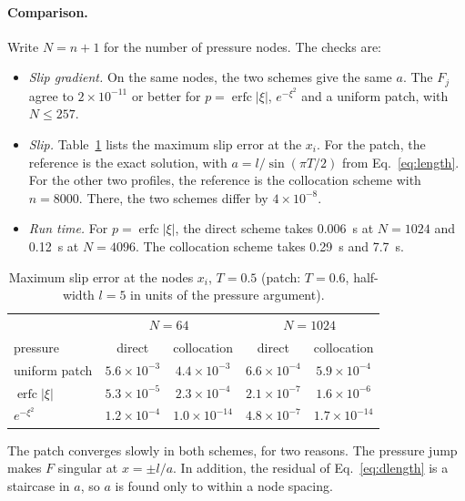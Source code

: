 \documentclass[12pt]{article}
\newcommand{\erfc}{\operatorname{erfc}}
\begin{document}
\paragraph{Comparison.} Write $N=n+1$ for the number of pressure nodes. The
checks are:
\begin{itemize}
	\item \emph{Slip gradient.} On the same nodes, the two schemes give the same
	      $a$. The $F_j$ agree to $2\times10^{-11}$ or better for $p = \erfc|\xi|$,
	      $e^{-\xi^2}$ and a uniform patch, with $N\le257$.
	\item \emph{Slip.} Table~\ref{tab:direct} lists the maximum slip error at the
	      $x_i$. For the patch, the reference is the exact solution, with
	      $a = l/\sin(\pi T/2)$ from Eq.~\eqref{eq:length}. For the other two
	      profiles, the reference is the collocation scheme with $n=8000$. There,
	      the two schemes differ by $4\times10^{-8}$.
	\item \emph{Run time.} For $p=\erfc|\xi|$, the direct scheme takes 0.006~s
	      at $N=1024$ and 0.12~s at $N=4096$. The collocation scheme takes 0.29~s
	      and 7.7~s.
\end{itemize}

\begin{table}[H]
	\centering
	\caption{Maximum slip error at the nodes $x_i$, $T=0.5$ (patch: $T=0.6$,
		half-width $l=5$ in units of the pressure argument).}
	\label{tab:direct}
	\begin{tabular}{lcccc}
		\hline
		& \multicolumn{2}{c}{$N=64$} & \multicolumn{2}{c}{$N=1024$} \\
		pressure        & direct             & collocation         & direct             & collocation         \\
		\hline
		uniform patch   & $5.6\times10^{-3}$ & $4.4\times10^{-3}$  & $6.6\times10^{-4}$ & $5.9\times10^{-4}$  \\
		$\erfc|\xi|$    & $5.3\times10^{-5}$ & $2.3\times10^{-4}$  & $2.1\times10^{-7}$ & $1.6\times10^{-6}$  \\
		$e^{-\xi^2}$    & $1.2\times10^{-4}$ & $1.0\times10^{-14}$ & $4.8\times10^{-7}$ & $1.7\times10^{-14}$ \\
		\hline
	\end{tabular}
\end{table}

The patch converges slowly in both schemes, for two reasons. The pressure jump
makes $F$ singular at $x=\pm l/a$. In addition, the residual of
Eq.~\eqref{eq:dlength} is a staircase in $a$, so $a$ is found only to within
a node spacing.
\end{document}
